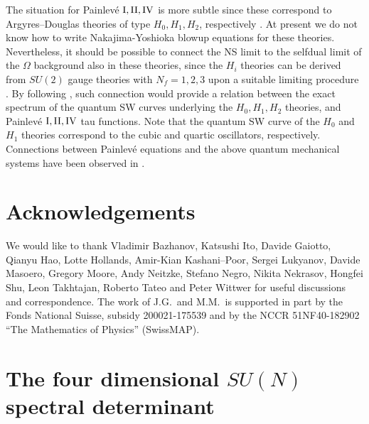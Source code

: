 \documentclass[a4paper,11pt]{article}
\theoremstyle{definition}
\begin{document}
The situation for Painlev\'e $\rm I, II, IV$ is more subtle since
these correspond to Argyres--Douglas theories of type $H_0, H_1, H_2$,
respectively \cite{blmst}.  At present we do not know how to write
Nakajima-Yoshioka blowup equations for these theories.  Nevertheless,
it should be possible to connect the NS limit to the selfdual limit of
the $\Omega$ background also in these theories, since the $H_i$
theories can be derived from $SU(2)$ gauge theories with $N_f=1,2,3$
upon a suitable limiting procedure \cite{ad,Argyres:1995xn}. By
following \cite{gg-qm,ito-shu}, such connection would provide a
relation between the exact spectrum of the quantum SW curves
underlying the $H_0, H_1, H_2$ theories, and Painlev\'e
$\rm I, II, IV$ tau functions.  Note that the quantum SW curve of the
$H_0$ and $H_1$ theories correspond to the cubic and quartic
oscillators, respectively. Connections between Painlev\'e equations
and the above quantum mechanical systems have been observed in
\cite{dm1,dm2,nok2,bender-painleve}.


\section*{Acknowledgements}
We would like to thank Vladimir Bazhanov, Katsushi Ito, Davide
Gaiotto, Qianyu Hao, Lotte Hollands, Amir-Kian Kashani--Poor, Sergei
Lukyanov, Davide Masoero, Gregory Moore, Andy Neitzke, Stefano Negro,
Nikita Nekrasov, Hongfei Shu, Leon Takhtajan, Roberto Tateo and Peter
Wittwer for useful discussions and correspondence.
The work of J.G.\ and M.M.\ is supported in part by the Fonds National
Suisse, subsidy 200021-175539 and by the NCCR 51NF40-182902 ``The
Mathematics of Physics'' (SwissMAP).

\appendix


\section{The four dimensional $SU(N)$ spectral determinant}
\label{asun}
\end{document}
